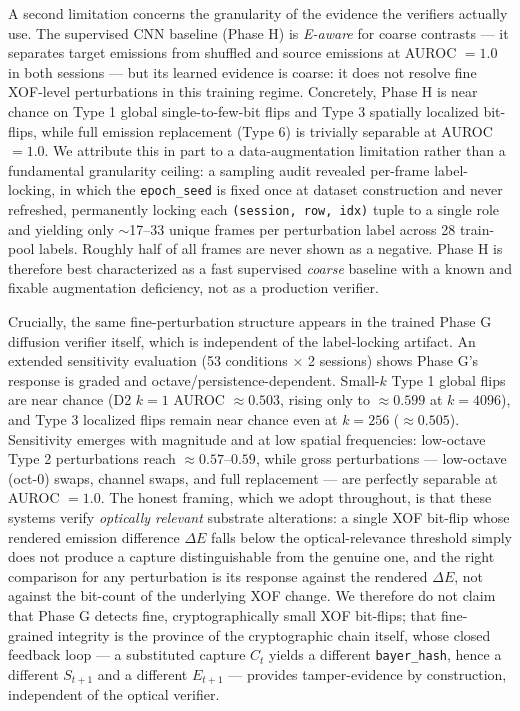 A second limitation concerns the granularity of the evidence the verifiers actually use. The supervised CNN baseline (Phase H) is \emph{E-aware} for coarse contrasts --- it separates target emissions from shuffled and source emissions at AUROC $=1.0$ in both sessions --- but its learned evidence is coarse: it does not resolve fine XOF-level perturbations in this training regime. Concretely, Phase H is near chance on Type 1 global single-to-few-bit flips and Type 3 spatially localized bit-flips, while full emission replacement (Type 6) is trivially separable at AUROC $=1.0$. We attribute this in part to a data-augmentation limitation rather than a fundamental granularity ceiling: a sampling audit revealed per-frame label-locking, in which the \texttt{epoch\_seed} is fixed once at dataset construction and never refreshed, permanently locking each \texttt{(session, row, idx)} tuple to a single role and yielding only $\sim$17--33 unique frames per perturbation label across 28 train-pool labels. Roughly half of all frames are never shown as a negative. Phase H is therefore best characterized as a fast supervised \emph{coarse} baseline with a known and fixable augmentation deficiency, not as a production verifier.

Crucially, the same fine-perturbation structure appears in the trained Phase G diffusion verifier itself, which is independent of the label-locking artifact. An extended sensitivity evaluation (53 conditions $\times$ 2 sessions) shows Phase G's response is graded and octave/persistence-dependent. Small-$k$ Type 1 global flips are near chance (D2 $k{=}1$ AUROC $\approx 0.503$, rising only to $\approx 0.599$ at $k=4096$), and Type 3 localized flips remain near chance even at $k=256$ ($\approx 0.505$). Sensitivity emerges with magnitude and at low spatial frequencies: low-octave Type 2 perturbations reach $\approx 0.57$--$0.59$, while gross perturbations --- low-octave (oct-0) swaps, channel swaps, and full replacement --- are perfectly separable at AUROC $=1.0$. The honest framing, which we adopt throughout, is that these systems verify \emph{optically relevant} substrate alterations: a single XOF bit-flip whose rendered emission difference $\Delta E$ falls below the optical-relevance threshold simply does not produce a capture distinguishable from the genuine one, and the right comparison for any perturbation is its response against the rendered $\Delta E$, not against the bit-count of the underlying XOF change. We therefore do not claim that Phase G detects fine, cryptographically small XOF bit-flips; that fine-grained integrity is the province of the cryptographic chain itself, whose closed feedback loop --- a substituted capture $C_t$ yields a different \texttt{bayer\_hash}, hence a different $S_{t+1}$ and a different $E_{t+1}$ --- provides tamper-evidence by construction, independent of the optical verifier.

